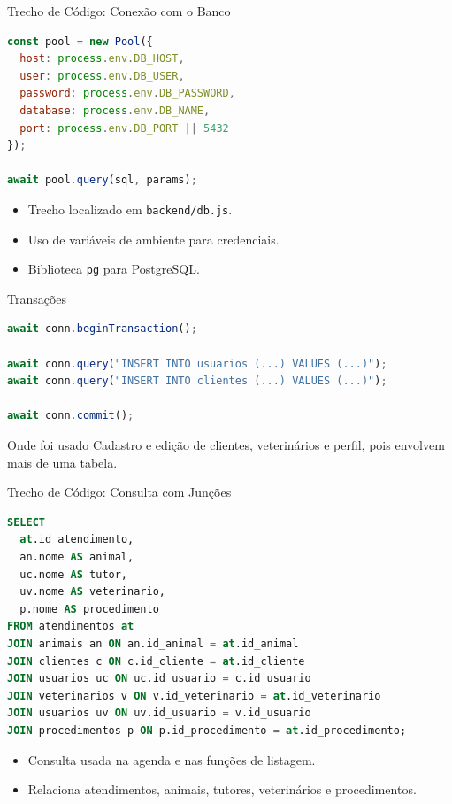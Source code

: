 \documentclass[aspectratio=169,11pt]{beamer}
\begin{document}
\begin{frame}[fragile]{Trecho de Código: Conexão com o Banco}
  \begin{lstlisting}[style=codigo,language=JavaScript]
const pool = new Pool({
  host: process.env.DB_HOST,
  user: process.env.DB_USER,
  password: process.env.DB_PASSWORD,
  database: process.env.DB_NAME,
  port: process.env.DB_PORT || 5432
});

await pool.query(sql, params);
  \end{lstlisting}

  \begin{itemize}
    \item Trecho localizado em \texttt{backend/db.js}.
    \item Uso de variáveis de ambiente para credenciais.
    \item Biblioteca \texttt{pg} para PostgreSQL.
  \end{itemize}
\end{frame}

\begin{frame}[fragile]{Transações}
  \begin{lstlisting}[style=codigo,language=JavaScript]
await conn.beginTransaction();

await conn.query("INSERT INTO usuarios (...) VALUES (...)");
await conn.query("INSERT INTO clientes (...) VALUES (...)");

await conn.commit();
  \end{lstlisting}

  \begin{block}{Onde foi usado}
    Cadastro e edição de clientes, veterinários e perfil, pois envolvem mais de uma tabela.
  \end{block}
\end{frame}

\begin{frame}[fragile]{Trecho de Código: Consulta com Junções}
  \begin{lstlisting}[style=codigo,language=SQL]
SELECT
  at.id_atendimento,
  an.nome AS animal,
  uc.nome AS tutor,
  uv.nome AS veterinario,
  p.nome AS procedimento
FROM atendimentos at
JOIN animais an ON an.id_animal = at.id_animal
JOIN clientes c ON c.id_cliente = at.id_cliente
JOIN usuarios uc ON uc.id_usuario = c.id_usuario
JOIN veterinarios v ON v.id_veterinario = at.id_veterinario
JOIN usuarios uv ON uv.id_usuario = v.id_usuario
JOIN procedimentos p ON p.id_procedimento = at.id_procedimento;
\end{lstlisting}
\begin{itemize}
  \item Consulta usada na agenda e nas funções de listagem.
  \item Relaciona atendimentos, animais, tutores, veterinários e procedimentos.
\end{itemize}
\end{frame}
\end{document}
